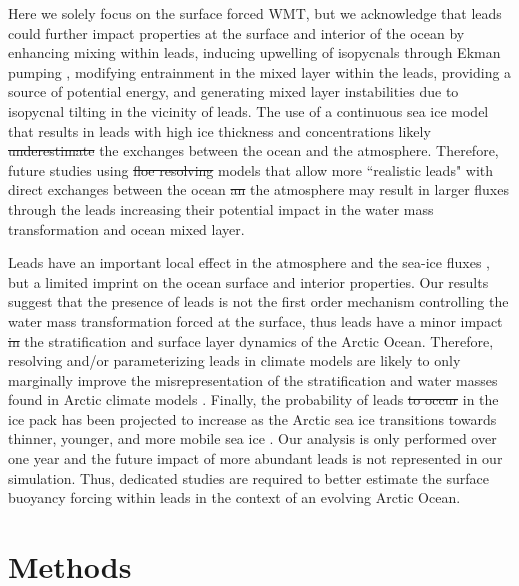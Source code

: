 \documentclass[lineno,sn-basic]{sn-jnl}%
\providecommand{\DIFadd}[1]{{\protect\color{blue}\uwave{#1}}} %
\providecommand{\DIFdel}[1]{{\protect\color{red}\sout{#1}}}                      %
\providecommand{\DIFaddbegin}{} %
\providecommand{\DIFaddend}{} %
\providecommand{\DIFdelbegin}{} %
\providecommand{\DIFdelend}{} %
\newcommand{\DIFscaledelfig}{0.5}
\newlength{\DIFdelgraphicswidth} %
\newlength{\DIFdelgraphicsheight} %
\newcommand{\DIFaddincludegraphics}[2][]{{\color{blue}\fbox{\DIFOincludegraphics[#1]{#2}}}} %
\newcommand{\DIFdelincludegraphics}[2][]{%
\sbox{\DIFdelgraphicsbox}{\DIFOincludegraphics[#1]{#2}}%
\settoboxwidth{\DIFdelgraphicswidth}{\DIFdelgraphicsbox} %
\settoboxtotalheight{\DIFdelgraphicsheight}{\DIFdelgraphicsbox} %
\scalebox{\DIFscaledelfig}{%
\parbox[b]{\DIFdelgraphicswidth}{\usebox{\DIFdelgraphicsbox}\\[-\baselineskip] \rule{\DIFdelgraphicswidth}{0em}}\llap{\resizebox{\DIFdelgraphicswidth}{\DIFdelgraphicsheight}{%
\setlength{\unitlength}{\DIFdelgraphicswidth}%
\begin{picture}(1,1)%
\thicklines\linethickness{2pt} %
{\color[rgb]{1,0,0}\put(0,0){\framebox(1,1){}}}%
{\color[rgb]{1,0,0}\put(0,0){\line( 1,1){1}}}%
{\color[rgb]{1,0,0}\put(0,1){\line(1,-1){1}}}%
\end{picture}%
}\hspace*{3pt}}} %
} %
\DeclareRobustCommand{\DIFaddbegin}{\DIFOaddbegin \let\includegraphics\DIFaddincludegraphics} %
\DeclareRobustCommand{\DIFaddend}{\DIFOaddend \let\includegraphics\DIFOincludegraphics} %
\DeclareRobustCommand{\DIFdelbegin}{\DIFOdelbegin \let\includegraphics\DIFdelincludegraphics} %
\DeclareRobustCommand{\DIFdelend}{\DIFOaddend \let\includegraphics\DIFOincludegraphics} %
\begin{document}
Here we solely focus on the surface forced WMT, but we acknowledge that leads could further impact properties at the surface and interior of the ocean by enhancing mixing within leads, inducing upwelling of isopycnals through Ekman pumping \citep{McPhee_LKF_2005}, modifying  entrainment in the mixed layer within the leads, providing a source of potential energy, and generating mixed layer instabilities due to isopycnal tilting in the vicinity of leads. The use of a continuous sea ice model that results in leads with high ice thickness and concentrations likely \DIFdelbegin \DIFdel{underestimate }\DIFdelend \DIFaddbegin \DIFadd{underestimates }\DIFaddend the exchanges between the ocean and the atmosphere. Therefore, future studies using \DIFdelbegin \DIFdel{floe resolving }\DIFdelend \DIFaddbegin \DIFadd{floe-resolving }\DIFaddend models that allow more ``realistic leads" with direct exchanges between the ocean \DIFdelbegin \DIFdel{an }\DIFdelend \DIFaddbegin \DIFadd{and }\DIFaddend the atmosphere may result in larger fluxes through the leads increasing their potential impact in the water mass transformation and ocean mixed layer.

Leads have an important local effect in the atmosphere and the sea-ice fluxes \citep{Marcq_flux_lead_2012, Lupkes_leads_2008, Wettlaufer_insulator_1997, Smith_polynyas_1990}, but a limited imprint on the ocean surface and interior properties. Our results suggest that the presence of leads is not the first order mechanism controlling the water mass transformation forced at the surface, thus leads have a minor impact \DIFdelbegin \DIFdel{in }\DIFdelend \DIFaddbegin \DIFadd{on }\DIFaddend the stratification and surface layer dynamics of the Arctic Ocean.
Therefore, resolving and/or parameterizing leads in climate models are likely to only marginally improve the misrepresentation of the stratification and water masses found in Arctic climate models \citep{Wang_ompi_2024,Ilicak_core_2016}. Finally, the probability of leads \DIFdelbegin \DIFdel{to occur }\DIFdelend \DIFaddbegin \DIFadd{occurring }\DIFaddend in the ice pack has been projected to increase as the Arctic sea ice transitions towards thinner, younger, and more mobile sea ice \citep{Boutin_rheology_2023, IPCC_arctic_2022}. Our analysis is only performed over one year and the future impact of more abundant leads is not represented in our simulation. Thus, dedicated studies are required to better estimate the surface buoyancy forcing within leads in the context of an evolving Arctic Ocean.

\section{Methods}
\end{document}
